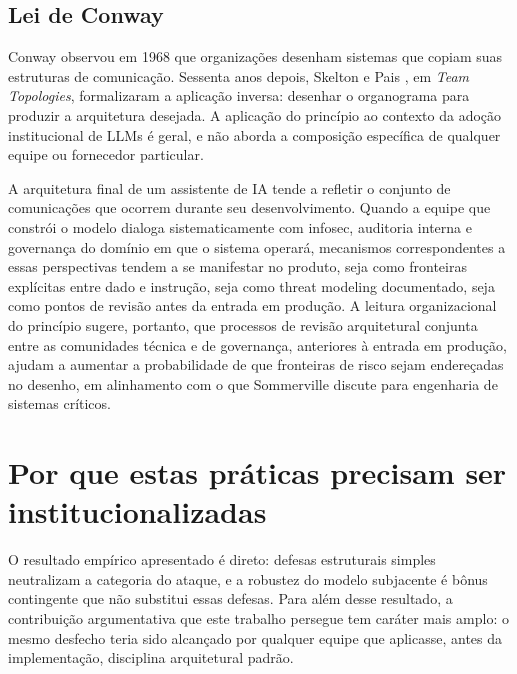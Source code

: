 \documentclass[11pt,a4paper]{article}
\begin{document}
\subsection{Lei de Conway}

Conway \cite{conway1968} observou em 1968 que organizações desenham sistemas que copiam suas estruturas de comunicação. Sessenta anos depois, Skelton e Pais \cite{skelton2019}, em \emph{Team Topologies}, formalizaram a aplicação inversa: desenhar o organograma para produzir a arquitetura desejada. A aplicação do princípio ao contexto da adoção institucional de LLMs é geral, e não aborda a composição específica de qualquer equipe ou fornecedor particular.

A arquitetura final de um assistente de IA tende a refletir o conjunto de comunicações que ocorrem durante seu desenvolvimento. Quando a equipe que constrói o modelo dialoga sistematicamente com infosec, auditoria interna e governança do domínio em que o sistema operará, mecanismos correspondentes a essas perspectivas tendem a se manifestar no produto, seja como fronteiras explícitas entre dado e instrução, seja como threat modeling documentado, seja como pontos de revisão antes da entrada em produção. A leitura organizacional do princípio sugere, portanto, que processos de revisão arquitetural conjunta entre as comunidades técnica e de governança, anteriores à entrada em produção, ajudam a aumentar a probabilidade de que fronteiras de risco sejam endereçadas no desenho, em alinhamento com o que Sommerville \cite{sommerville2016} discute para engenharia de sistemas críticos.

\section{Por que estas práticas precisam ser institucionalizadas}

O resultado empírico apresentado é direto: defesas estruturais simples neutralizam a categoria do ataque, e a robustez do modelo subjacente é bônus contingente que não substitui essas defesas. Para além desse resultado, a contribuição argumentativa que este trabalho persegue tem caráter mais amplo: o mesmo desfecho teria sido alcançado por qualquer equipe que aplicasse, antes da implementação, disciplina arquitetural padrão.
\end{document}
